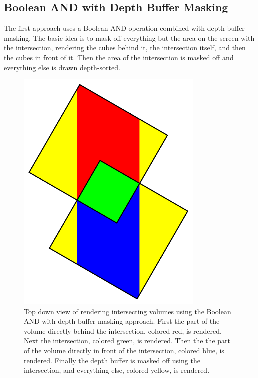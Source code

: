 \documentclass{article}
\begin{document}
\subsection{Boolean AND with Depth Buffer Masking}

The first approach uses a Boolean AND operation combined with depth-buffer
masking.  The basic idea is to mask off everything but the area on the screen
with the intersection, rendering the cubes behind it, the intersection itself,
and then the cubes in front of it.  Then the area of the intersection is masked
off and everything else is drawn depth-sorted.

\begin{figure}
\centering
\includegraphics[width=0.8\textwidth]{boolean-and.pdf}
\caption{
Top down view of rendering intersecting volumes using the Boolean AND with depth
buffer masking approach.  First the part of the volume directly behind the
intersection, colored red, is rendered.  Next the intersection, colored green,
is rendered.  Then the the part of the volume directly in front of the
intersection, colored blue, is rendered.  Finally the depth buffer is masked off
using the intersection, and everything else, colored yellow, is rendered.
}
\label{boolean-and}
\end{figure}
\end{document}

